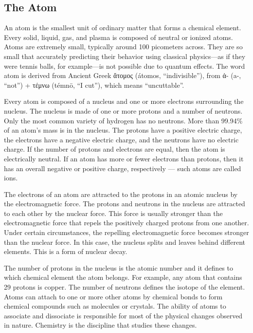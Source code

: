 \hypertarget{the-atom}{%
\subsection{The Atom}\label{the-atom}}

An atom is the smallest unit of ordinary matter that forms a chemical
element. Every solid, liquid, gas, and plasma is composed of neutral or
ionized atoms. Atoms are extremely small, typically around 100
picometers across. They are so small that accurately predicting their
behavior using classical physics---as if they were tennis balls, for
example---is not possible due to quantum effects. The word atom is
derived from Ancient Greek ἄτομος (átomos, ``indivisible''), from ἀ-
(a-, ``not'') + τέμνω (témnō, ``I cut''), which means ``uncuttable''.

Every atom is composed of a nucleus and one or more electrons
surrounding the nucleus. The nucleus is made of one or more protons and
a number of neutrons. Only the most common variety of hydrogen has no
neutrons. More than 99.94\% of an atom's mass is in the nucleus. The
protons have a positive electric charge, the electrons have a negative
electric charge, and the neutrons have no electric charge. If the number
of protons and electrons are equal, then the atom is electrically
neutral. If an atom has more or fewer electrons than protons, then it
has an overall negative or positive charge, respectively --- such atoms
are called ions.

The electrons of an atom are attracted to the protons in an atomic
nucleus by the electromagnetic force. The protons and neutrons in the
nucleus are attracted to each other by the nuclear force. This force is
usually stronger than the electromagnetic force that repels the
positively charged protons from one another. Under certain
circumstances, the repelling electromagnetic force becomes stronger than
the nuclear force. In this case, the nucleus splits and leaves behind
different elements. This is a form of nuclear decay.

The number of protons in the nucleus is the atomic number and it defines
to which chemical element the atom belongs. For example, any atom that
contains 29 protons is copper. The number of neutrons defines the
isotope of the element. Atoms can attach to one or more other atoms by
chemical bonds to form chemical compounds such as molecules or crystals.
The ability of atoms to associate and dissociate is responsible for most
of the physical changes observed in nature. Chemistry is the discipline
that studies these changes.

